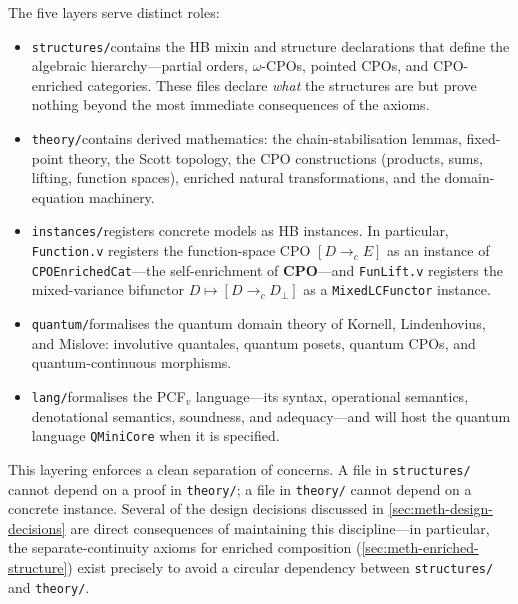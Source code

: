 The five layers serve distinct roles:
\begin{itemize}
  \item \texttt{structures/}\enspace contains the HB mixin and structure
    declarations that define the algebraic hierarchy---partial orders,
    $\omega$-CPOs, pointed CPOs, and CPO-enriched categories.  These files
    declare \emph{what} the structures are but prove nothing beyond the most
    immediate consequences of the axioms.

  \item \texttt{theory/}\enspace contains derived mathematics: the
    chain-stabilisation lemmas, fixed-point theory, the Scott topology, the
    CPO constructions (products, sums, lifting, function spaces), enriched
    natural transformations, and the domain-equation machinery.

  \item \texttt{instances/}\enspace registers concrete models as HB
    instances.  In particular, \texttt{Function.v} registers the function-space
    CPO $[D \to_c E]$ as an instance of \texttt{CPOEnrichedCat}---the
    self-enrichment of \textbf{CPO}---and \texttt{FunLift.v} registers the
    mixed-variance bifunctor $D \mapsto [D \to_c D_\bot]$ as a
    \texttt{MixedLCFunctor} instance.

  \item \texttt{quantum/}\enspace formalises the quantum domain theory of
    Kornell, Lindenhovius, and Mislove: involutive quantales, quantum posets,
    quantum CPOs, and quantum-continuous morphisms.

  \item \texttt{lang/}\enspace formalises the PCF$_v$ language---its syntax,
    operational semantics, denotational semantics, soundness, and adequacy---and
    will host the quantum language \texttt{QMiniCore} when it is specified.
\end{itemize}

This layering enforces a clean separation of concerns.  A file in
\texttt{structures/} cannot depend on a proof in \texttt{theory/}; a file
in \texttt{theory/} cannot depend on a concrete instance.  Several of the
design decisions discussed in \cref{sec:meth-design-decisions} are
direct consequences of maintaining this discipline---in particular, the
separate-continuity axioms for enriched composition (\cref{sec:meth-enriched-structure})
exist precisely to avoid a circular dependency between \texttt{structures/}
and \texttt{theory/}.


